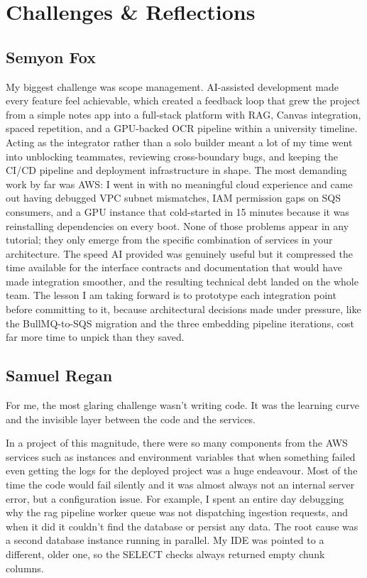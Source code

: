 \documentclass[12pt,a4paper]{article}
\begin{document}
\section{Challenges \& Reflections}
\label{sec:reflections}

\subsection{Semyon Fox}

My biggest challenge was scope management. AI-assisted development made every feature feel achievable, which created a feedback loop that grew the project from a simple notes app into a full-stack platform with RAG, Canvas integration, spaced repetition, and a GPU-backed OCR pipeline within a university timeline. Acting as the integrator rather than a solo builder meant a lot of my time went into unblocking teammates, reviewing cross-boundary bugs, and keeping the CI/CD pipeline and deployment infrastructure in shape. The most demanding work by far was AWS: I went in with no meaningful cloud experience and came out having debugged VPC subnet mismatches, IAM permission gaps on SQS consumers, and a GPU instance that cold-started in 15 minutes because it was reinstalling dependencies on every boot. None of those problems appear in any tutorial; they only emerge from the specific combination of services in your architecture. The speed AI provided was genuinely useful but it compressed the time available for the interface contracts and documentation that would have made integration smoother, and the resulting technical debt landed on the whole team. The lesson I am taking forward is to prototype each integration point before committing to it, because architectural decisions made under pressure, like the BullMQ-to-SQS migration and the three embedding pipeline iterations, cost far more time to unpick than they saved.

\subsection{Samuel Regan}

For me, the most glaring challenge wasn't writing code. It was the learning curve and the invisible layer between the code and the services.

In a project of this magnitude, there were so many components from the AWS services such as instances and environment variables that when something failed even getting the logs for the deployed project was a huge endeavour. Most of the time the code would fail silently and it was almost always not an internal server error, but a configuration issue. For example, I spent an entire day debugging why the rag pipeline worker queue was not dispatching ingestion requests, and when it did it couldn't find the database or persist any data. The root cause was a second database instance running in parallel. My IDE was pointed to a different, older one, so the SELECT checks always returned empty chunk columns.
\end{document}
